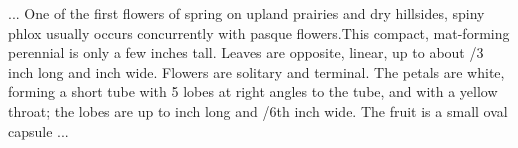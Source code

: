 \documentclass{article}
\begin{document}
... One of the first flowers of spring on upland prairies and dry hillsides,
spiny phlox usually occurs concurrently with pasque flowers.This compact,
mat-forming perennial is only a few inches tall. Leaves are opposite,
linear, up to about /3 inch long and  inch
wide. Flowers are solitary and terminal. The petals are white, forming a
short tube with 5 lobes at right angles to the tube, and with a yellow
throat; the lobes are up to  inch long and /6th
inch wide. The fruit is a small oval capsule ...
\end{document}
